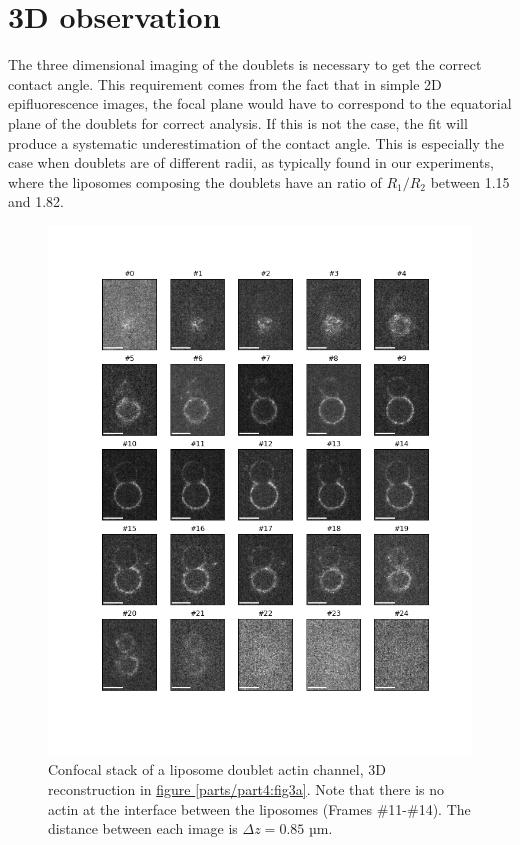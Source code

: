 \documentclass[A4paperpaper,11pt,english]{sphinxmanual}
\begin{document}
\section{3D observation}
\label{parts/part4:d-observation}\label{parts/part4:d-obs}
The three dimensional imaging of the doublets is necessary to get the correct
contact angle. This requirement comes from the fact that in simple 2D epifluorescence
images, the focal plane would have to correspond to the equatorial plane of the doublets for correct analysis. If
this is not the case, the fit will produce a systematic underestimation of the contact angle.
This is especially the case when doublets are of different radii, as typically found in our
experiments, where the liposomes composing the doublets have an ratio of \(R_1 / R_2\) between 1.15 and 1.82.
\begin{figure}[htbp]
\centering
\capstart

\includegraphics[width=0.900\linewidth]{light_table.png}
\caption{Confocal stack of a liposome doublet actin channel, 3D reconstruction in
\hyperref[parts/part4:fig3a]{figure  \ref*{parts/part4:fig3a}}. Note that there is no actin at the interface between
the liposomes (Frames \#11-\#14). The distance between each image is \(\Delta z=0.85\) µm.}\label{parts/part4:confocal-stack}\end{figure}
\end{document}
